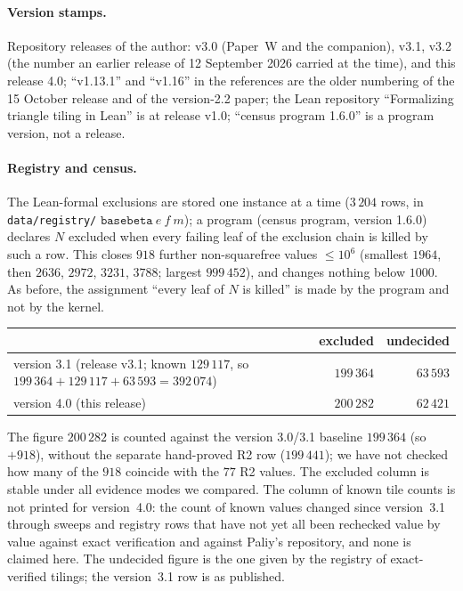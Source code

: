 \documentclass[11pt,reqno]{amsart}
\theoremstyle{plain}
\theoremstyle{definition}
\begin{document}
\paragraph{Version stamps.} Repository releases of the author: v3.0 (Paper~W and the companion), v3.1, v3.2 (the number an earlier release of 12 September 2026 carried at the time), and this release 4.0; ``v1.13.1'' and ``v1.16'' in the references are the older numbering of the 15 October release and of the version-2.2 paper; the Lean repository ``Formalizing triangle tiling in Lean'' is at release v1.0; ``census program 1.6.0'' is a program version, not a release.\paragraph{Registry and census.} The Lean-formal exclusions are stored one instance at a time ($3\,204$ rows, in \texttt{data/registry/} $\texttt{basebeta}\ e\ f\ m$); a program (census program, version 1.6.0) declares $N$ excluded when every failing leaf of the exclusion chain is killed by such a row. This closes $918$ further non-squarefree values $\le10^6$ (smallest $1964$, then $2636$, $2972$, $3231$, $3788$; largest $999\,452$), and changes nothing below $1000$. As before, the assignment ``every leaf of $N$ is killed'' is made by the program and not by the kernel.
\begin{center}\small
\begin{tabular}{@{}lrr@{}}
\toprule
 & excluded & undecided\\
\midrule
version 3.1 (release v3.1; known $129\,117$, so $199\,364+129\,117+63\,593=392\,074$) & $199\,364$ & $63\,593$\\
version 4.0 (this release) & $200\,282$ & $62\,421$\\
\bottomrule
\end{tabular}
\end{center}
The figure $200\,282$ is counted against the version 3.0/3.1 baseline $199\,364$ (so $+918$), without the separate hand-proved R2 row ($199\,441$); we have not checked how many of the $918$ coincide with the $77$ R2 values. The excluded column is stable under all evidence modes we compared. The column of known tile counts is not printed for version~4.0: the count of known values changed since version~3.1 through sweeps and registry rows that have not yet all been rechecked value by value against exact verification and against Paliy's repository, and none is claimed here. The undecided figure is the one given by the registry of exact-verified tilings; the version~3.1 row is as published.
\end{document}
